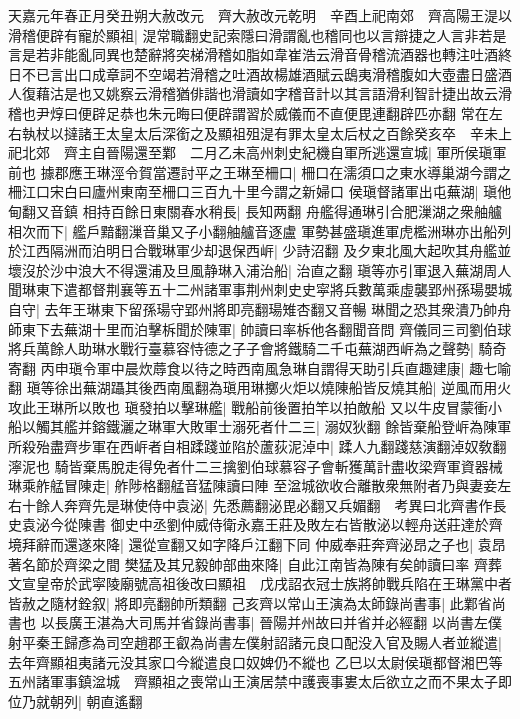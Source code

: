 天嘉元年春正月癸丑朔大赦改元　齊大赦改元乾明　辛酉上祀南郊　齊高陽王湜以滑稽便辟有寵於顯祖|{
	湜常職翻史記索隱曰滑謂亂也稽同也以言辯捷之人言非若是言是若非能亂同異也楚辭將突梯滑稽如脂如韋崔浩云滑音骨稽流酒器也轉注吐酒終日不已言出口成章詞不空竭若滑稽之吐酒故楊雄酒賦云鴟夷滑稽腹如大壺盡日盛酒人復藉沽是也又姚察云滑稽猶俳諧也滑讀如字稽音計以其言語滑利智計捷出故云滑稽也尹焞曰便辟足恭也朱元晦曰便辟謂習於威儀而不直便毘連翻辟匹亦翻}
常在左右執杖以撻諸王太皇太后深銜之及顯祖殂湜有罪太皇太后杖之百餘癸亥卒　辛未上祀北郊　齊主自晉陽還至鄴　二月乙未高州刺史紀機自軍所逃還宣城|{
	軍所侯瑱軍前也}
據郡應王琳涇令賀當遷討平之王琳至柵口|{
	柵口在濡須口之東水導巢湖今謂之柵江口宋白曰廬州東南至柵口三百九十里今謂之新婦口}
侯瑱督諸軍出屯蕪湖|{
	瑱他甸翻又音鎮}
相持百餘日東關春水稍長|{
	長知两翻}
舟艦得通琳引合肥漅湖之衆舳艫相次而下|{
	艦戶黯翻漅音巢又子小翻舳艫音逐盧}
軍勢甚盛瑱進軍虎檻洲琳亦出船列於江西隔洲而泊明日合戰琳軍少却退保西㟁|{
	少詩沼翻}
及夕東北風大起吹其舟艦並壞沒於沙中浪大不得還浦及旦風静琳入浦治船|{
	治直之翻}
瑱等亦引軍退入蕪湖周人聞琳東下遣都督荆襄等五十二州諸軍事荆州刺史史寜將兵數萬乘虛襲郢州孫瑒嬰城自守|{
	去年王琳東下留孫瑒守郢州將即亮翻瑒雉杏翻又音暢}
琳聞之恐其衆潰乃帥舟師東下去蕪湖十里而泊擊柝聞於陳軍|{
	帥讀曰率柝他各翻聞音問}
齊儀同三司劉伯球將兵萬餘人助琳水戰行臺慕容恃德之子子會將鐵騎二千屯蕪湖西㟁為之聲勢|{
	騎奇寄翻}
丙申瑱令軍中晨炊蓐食以待之時西南風急琳自謂得天助引兵直趣建康|{
	趣七喻翻}
瑱等徐出蕪湖躡其後西南風翻為瑱用琳擲火炬以燒陳船皆反燒其船|{
	逆風而用火攻此王琳所以敗也}
瑱發拍以擊琳艦|{
	戰船前後置拍竿以拍敵船}
又以牛皮冒蒙衝小船以觸其艦并鎔鐵灑之琳軍大敗軍士溺死者什二三|{
	溺奴狄翻}
餘皆棄船登㟁為陳軍所殺殆盡齊步軍在西㟁者自相蹂踐並陷於蘆荻泥淖中|{
	蹂人九翻踐慈演翻淖奴敎翻濘泥也}
騎皆棄馬脫走得免者什二三擒劉伯球慕容子會斬獲萬計盡收梁齊軍資器械琳乘舴艋冒陳走|{
	舴陟格翻艋音猛陳讀曰陣}
至湓城欲收合離散衆無附者乃與妻妾左右十餘人奔齊先是琳使侍中袁泌|{
	先悉薦翻泌毘必翻又兵媚翻　考異曰北齊書作長史袁泌今從陳書}
御史中丞劉仲威侍衛永嘉王莊及敗左右皆散泌以輕舟送莊達於齊境拜辭而還遂來降|{
	還從宣翻又如字降戶江翻下同}
仲威奉莊奔齊泌昂之子也|{
	袁昂著名節於齊梁之間}
樊猛及其兄毅帥部曲來降|{
	自此江南皆為陳有矣帥讀曰率}
齊葬文宣皇帝於武寜陵廟號高祖後改曰顯祖　戊戌詔衣冠士族將帥戰兵陷在王琳黨中者皆赦之隨材銓叙|{
	將即亮翻帥所類翻}
己亥齊以常山王演為太師錄尚書事|{
	此鄴省尚書也}
以長廣王湛為大司馬并省錄尚書事|{
	晉陽并州故曰并省并必經翻}
以尚書左僕射平秦王歸彥為司空趙郡王叡為尚書左僕射詔諸元良口配没入官及賜人者並縱遣|{
	去年齊顯祖夷諸元没其家口今縱遣良口奴婢仍不縱也}
乙巳以太尉侯瑱都督湘巴等五州諸軍事鎮湓城　齊顯祖之喪常山王演居禁中護喪事婁太后欲立之而不果太子即位乃就朝列|{
	朝直遙翻}
